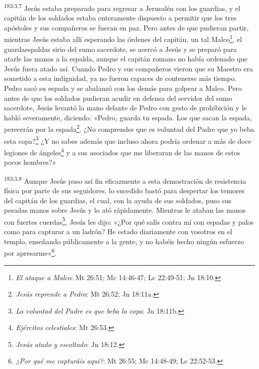 \par
\textsuperscript{183:3.7} Jesús estaba preparado para regresar a Jerusalén con los guardias, y el capitán de los soldados estaba enteramente dispuesto a permitir que los tres apóstoles y sus compañeros se fueran en paz. Pero antes de que pudieran partir, mientras Jesús estaba allí esperando las órdenes del capitán, un tal Malco\footnote{\textit{El ataque a Malco}: Mt 26:51; Mc 14:46-47; Lc 22:49-51; Jn 18:10.}, el guardaespaldas sirio del sumo sacerdote, se acercó a Jesús y se preparó para atarle las manos a la espalda, aunque el capitán romano no había ordenado que Jesús fuera atado así. Cuando Pedro y sus compañeros vieron que su Maestro era sometido a esta indignidad, ya no fueron capaces de contenerse más tiempo. Pedro sacó su espada y se abalanzó con los demás para golpear a Malco. Pero antes de que los soldados pudieran acudir en defensa del servidor del sumo sacerdote, Jesús levantó la mano delante de Pedro con gesto de prohibición y le habló severamente, diciendo: «Pedro, guarda tu espada. Los que sacan la espada, perecerán por la espada\footnote{\textit{Jesús reprende a Pedro}: Mt 26:52; Jn 18:11a.}. ¿No comprendes que es voluntad del Padre que yo beba esta copa?\footnote{\textit{La voluntad del Padre es que beba la copa}: Jn 18:11b.} ¿Y no sabes además que incluso ahora podría ordenar a más de doce legiones de ángeles\footnote{\textit{Ejércitos celestiales}: Mt 26:53.} y a sus asociados que me liberaran de las manos de estos pocos hombres?»

\par
\textsuperscript{183:3.8} Aunque Jesús puso así fin eficazmente a esta demostración de resistencia física por parte de sus seguidores, lo sucedido bastó para despertar los temores del capitán de los guardias, el cual, con la ayuda de sus soldados, puso sus pesadas manos sobre Jesús y lo ató rápidamente. Mientras le ataban las manos con fuertes cuerdas\footnote{\textit{Jesús atado y escoltado}: Jn 18:12.}, Jesús les dijo: «¿Por qué salís contra mí con espadas y palos como para capturar a un ladrón? He estado diariamente con vosotros en el templo, enseñando públicamente a la gente, y no habéis hecho ningún esfuerzo por apresarme»\footnote{\textit{¿Por qué me capturáis aquí?}: Mt 26:55; Mc 14:48-49; Lc 22:52-53.}.

